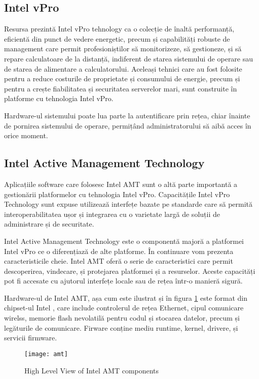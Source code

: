 \subsection{Intel vPro}

Resursa \cite{site:intel-vpro} prezintă Intel vPro tehnology ca o colecție de înaltă performanță, eficientă din punct de vedere energetic, precum și capabilități robuste de management care permit profesioniștilor să monitorizeze, să gestioneze, și să repare calculatoare de la distanță, indiferent de starea sistemului de operare sau de starea de alimentare a calculatorului. Aceleași tehnici care au fost folosite pentru a reduce costurile de proprietate și consumului de energie, precum și pentru a crește fiabilitatea și securitatea serverelor mari, sunt construite în platforme cu tehnologia Intel vPro.

Hardware-ul sistemului poate lua parte la autentificare prin rețea, chiar înainte de pornirea sistemului de operare, permițând administratorului să aibă acces în orice moment.


\subsection{Intel Active Management Technology}

Aplicațiile software care folosesc Intel AMT  \cite{site:intel-amt} sunt o altă parte importantă a gestionării platformelor cu tehnologia Intel vPro. Capacitățile Intel vPro Technology sunt expuse utilizează interfețe bazate pe standarde care să permită interoperabilitatea ușor și integrarea cu o varietate largă de soluții de administrare și de securitate.

Intel Active Management Technology este o componentă majoră a platformei Intel vPro ce o diferențiază de alte platforme. În continuare vom prezenta  caracteristicile cheie. 
Intel AMT oferă o serie de caracteristici care permit descoperirea, vindecare, și protejarea platformei și a resurselor. Aceste capacități pot fi accesate cu ajutorul interfețe locale sau de rețea într-o manieră sigură.

Hardware-ul de Intel AMT, așa cum este ilustrat și în figura \ref{amt} este format din chipset-ul Intel , care include controlerul de rețea Ethernet, cipul comunicare wirelss, memorie flash nevolatilă pentru codul și stocarea datelor, precum și legăturile de comunicare. Firware conține mediu runtime, kernel, drivere, și servicii firmware.

\begin{figure}
    \centering
    \texttt{[image: amt]}
    \caption{High Level View of Intel AMT components}
    \label{amt}
\end{figure}

